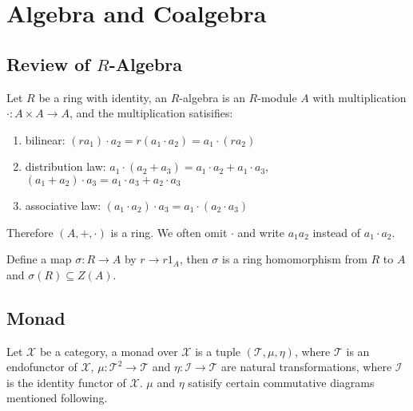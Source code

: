 \documentclass{article}
\begin{document}
\section{Algebra and Coalgebra}
\subsection{Review of $R$-Algebra}
Let $R$ be a ring with identity, an $R$-algebra is an $R$-module $A$ with
multiplication $\cdot : A \times A \to A$, and the multiplication
satisifies:
\begin{enumerate}
\item bilinear: $(r a_1) \cdot a_2 = r (a_1 \cdot a_2) = a_1 \cdot (r a_2)$
\item distribution law: $a_1 \cdot (a_2 + a_3) = a_1 \cdot a_2 + a_1 \cdot a_3$,
  $(a_1 + a_2) \cdot a_3 = a_1 \cdot a_3 + a_2 \cdot a_3$
\item associative law: $(a_1 \cdot a_2) \cdot a_3 = a_1 \cdot (a_2 \cdot a_3)$
\end{enumerate}
Therefore $(A, +, \cdot)$ is a ring.
We often omit $\cdot$ and write $a_1a_2$ instead of $a_1 \cdot a_2$.

Define a map $\sigma: R \to A$ by $r \to r 1_A$,
then $\sigma$ is a ring homomorphism from $R$ to $A$ and
$\sigma(R) \subseteq Z(A)$.

\subsection{Monad}
Let $\mathcal X$ be a category, a monad over $\mathcal X$ is a tuple $(\mathcal T, \mu, \eta)$,
where $\mathcal T$ is an endofunctor of $\mathcal X$, $\mu : \mathcal T^2 \to \mathcal T$
and $\eta : \mathcal I \to \mathcal T$ are natural transformations,
where $\mathcal I$ is the identity functor of $\mathcal X$.
$\mu$ and $\eta$ satisify certain commutative diagrams mentioned following.
\end{document}

